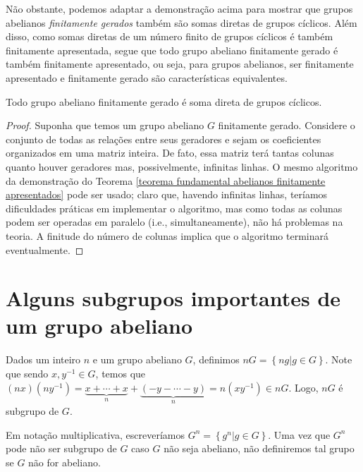     	\par\vspace{0.3cm} Não obstante, podemos adaptar a demonstração acima para mostrar que grupos 
    	abelianos \textit{finitamente gerados} também são somas diretas de grupos cíclicos. Além disso, 
    	como somas diretas de um número finito de grupos cíclicos é também finitamente apresentada, segue 
    	que todo grupo abeliano finitamente gerado é também finitamente apresentado, ou seja, para grupos
    	abelianos, ser finitamente apresentado e finitamente gerado são características equivalentes.
    	\begin{theorem}
    	\label{teorema fundamental abelianos finitamente gerados}
    		Todo grupo abeliano finitamente gerado é soma direta de grupos cíclicos.
    	\end{theorem}
    	\begin{proof}
    		Suponha que temos um grupo abeliano $G$ finitamente gerado. Considere o conjunto de todas 
    		as relações entre seus geradores e sejam os coeficientes organizados em uma matriz inteira. 
    		De fato, essa matriz terá tantas colunas quanto houver geradores mas, possivelmente, infinitas 
    		linhas. O mesmo algoritmo da demonstração do 
    		Teorema \ref{teorema fundamental abelianos finitamente apresentados} pode ser usado; claro que,
    		havendo infinitas linhas, teríamos dificuldades práticas em implementar o algoritmo, mas como 
    		todas as colunas podem ser operadas em paralelo (i.e., simultaneamente), não há problemas na teoria.
    		A finitude do número de colunas implica que o algoritmo terminará eventualmente.
    	\end{proof}
	\section{Alguns subgrupos importantes de um grupo abeliano}
    	Dados um inteiro $n$ e um grupo abeliano $G$, definimos $nG = \left\{ ng\vert g\in G \right\}$. 
    	Note que sendo $x,y^{-1}\in G$, temos que 
    	$(nx)(ny^{-1}) = \underbrace{x+\cdots+x}_{n} + \underbrace{(-y-\cdots-y)}_{n} = n(xy^{-1})\in nG$. 
    	Logo, $nG$ é subgrupo de $G$. 
    	
    	\par\vspace{0.3cm} Em notação multiplicativa, escreveríamos $G^n = \left\{ g^n\vert g\in G \right\}$. 
    	Uma vez que $G^n$ pode não ser subgrupo de $G$ caso $G$ não seja abeliano, não definiremos tal grupo 
    	se $G$ não for abeliano.
    	
